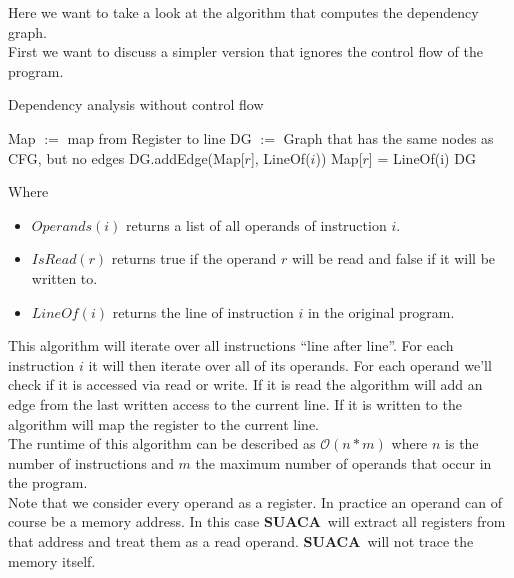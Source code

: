 \documentclass[a4paper,12pt,titlepage, twoside]{report}
\newcommand{\suaca}{\textbf{SUACA}}
\begin{document}
Here we want to take a look at the algorithm that computes the dependency graph. \\
First we want to discuss a simpler version that ignores the control flow of the program.

\begin{algorithm}[H]
    \SetAlgoLined
    \caption{Dependency analysis without control flow}
    Map $:=$ map from Register to line\;
    DG $:=$ Graph that has the same nodes as CFG, but no edges\;
     {
          {
              {
                 DG.addEdge(Map[$r$], LineOf($i$))\;
             }{
                Map[$r$] = LineOf(i)\;
            }
        }
    }
    \Return DG\;
\end{algorithm}

Where
\begin{itemize}
    \item $Operands(i)$ returns a list of all operands of instruction $i$.
    \item $IsRead(r)$ returns true if the operand $r$ will be read and false if it will be written to.
    \item $LineOf(i)$ returns the line of instruction $i$ in the original program.
\end{itemize}

This algorithm will iterate over all instructions ``line after line''. For each instruction $i$ it will then iterate over all of its operands. For each operand we'll check if it is accessed via read or write. If it is read the algorithm will add an edge from the last written access to the current line. If it is written to the algorithm will map the register to the current line.\\

The runtime of this algorithm can be described as $\mathcal{O}(n*m)$ where $n$ is the number of instructions and $m$ the maximum number of operands that occur in the program.\\

Note that we consider every operand as a register. In practice an operand can of course be a memory address. In this case \suaca\ will extract all registers from that address and treat them as a read operand. \suaca\ will not trace the memory itself.\\
\end{document}
